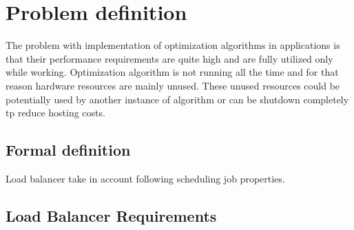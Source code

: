 
\section{Problem definition}\label{sec:problem-definition}

The problem with implementation of optimization algorithms in applications is that their
performance requirements are quite high and are fully utilized only while working.
Optimization algorithm is not running all the time and for that reason hardware resources are mainly unused.
These unused resources could be potentially used by another instance of algorithm
or can be shutdown completely tp reduce hosting costs.

\subsection{Formal definition}\label{subsec:what-i-want}
Load balancer take in account following scheduling job properties.



\subsection{Load Balancer Requirements}\label{subsec:load-balancer-requirements}
